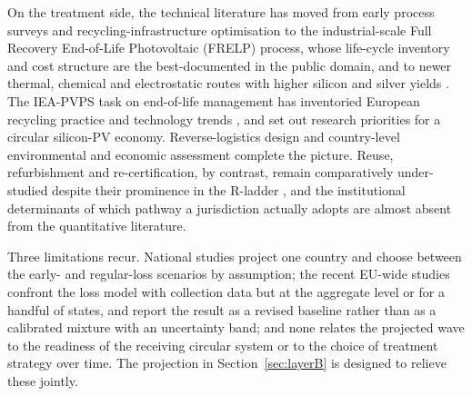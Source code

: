 \documentclass[a4paper,fleqn]{cas-sc}
\begin{document}
On the treatment side, the technical literature has moved from early process surveys \citep{fthenakis2000,tao2015} and recycling-infrastructure optimisation \citep{choi2010} to the industrial-scale Full Recovery End-of-Life Photovoltaic (FRELP) process, whose life-cycle inventory \citep{latunussa2016} and cost structure \citep{markert2020} are the best-documented in the public domain, and to newer thermal, chemical and electrostatic routes with higher silicon and silver yields \citep{fiandra2019,huang2017}. The IEA-PVPS task on end-of-life management has inventoried European recycling practice \citep{wambach2017} and technology trends \citep{komoto2018}, and \citet{heath2020} set out research priorities for a circular silicon-PV economy. Reverse-logistics design \citep{islam2020} and country-level environmental and economic assessment \citep{faircloth2019,maani2020} complete the picture. Reuse, refurbishment and re-certification, by contrast, remain comparatively under-studied despite their prominence in the R-ladder \citep{tsanakas2020}, and the institutional determinants of which pathway a jurisdiction actually adopts are almost absent from the quantitative literature.

Three limitations recur. National studies project one country and choose between the early- and regular-loss scenarios by assumption; the recent EU-wide studies confront the loss model with collection data but at the aggregate level or for a handful of states, and report the result as a revised baseline rather than as a calibrated mixture with an uncertainty band; and none relates the projected wave to the readiness of the receiving circular system or to the choice of treatment strategy over time. The projection in Section~\ref{sec:layerB} is designed to relieve these jointly.
\end{document}
